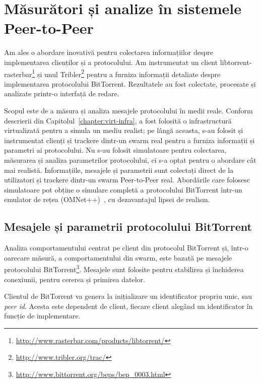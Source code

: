 
\chapter{Măsurători și analize în sistemele Peer-to-Peer}
\label{chapter:proto-measure}

Am ales o abordare inovativă pentru colectarea informațiilor despre
implementarea clienților și a protocolului. Am instrumentat un client
libtorrent-rasterbar\footnote{\url{http://www.rasterbar.com/products/libtorrent/}}
și unul Tribler\footnote{\url{http://www.tribler.org/trac/}}
pentru a furniza informații detaliate despre implementarea protocolului
BitTorrent. Rezultatele au fost colectate, procesate și analizate printr-o
interfață de redare.

Scopul este de a măsura și analiza mesajele protocolului în medii reale.
Conform descrierii din Capitolul~\ref{chapter:virt-infra}, a fost folosită o
infrastructură virtualizată pentru a simula un mediu realist; pe lângă aceasta,
s-au folosit și instrumentat clienți și trackere dintr-un swarm real pentru a
furniza informații și parametri ai protocolului. Nu s-au folosit simulatoare
pentru colectarea, măsurarea și analiza parametrilor protocolului, ci s-a
optat pentru o abordare cât mai realistă. Informațiile, mesajele și parametrii
sunt colectați direct de la utilizatori și trackere dintr-un swarm
Peer-to-Peer real. Abordările care folosesc simulatoare pot obține o
simulare completă a protocolului BitTorrent într-un emulator de rețea
(OMNet++)~\cite{simulating-bittorrent}, cu dezavantajul lipsei de realism.

\section{Mesajele și parametrii protocolului BitTorrent}
\label{sec:proto-measure:protocol-messages}

Analiza comportamentului centrat pe client din protocolul BitTorrent și,
într-o oarecare măsură, a comportamentului din swarm, este bazată pe mesajele
protocolului BitTorrent\footnote{\url{http://www.bittorrent.org/beps/bep\_0003.html}}.
Mesajele sunt folosite pentru stabilirea și închiderea conexiunii, pentru
cererea și primirea datelor.

Clientul de BitTorrent va genera la inițializare un identificator propriu unic,
sau \textit{peer id}. Acesta este dependent de client, fiecare client alegând
un identificator în funcție de implementare.

